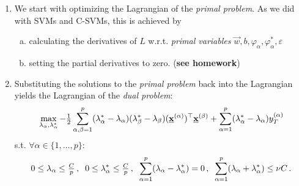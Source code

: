 \begin{frame}\frametitle{\subsecname}

\begin{enumerate}
\item We start with optimizing the Lagrangian of the \emph{primal problem}. As we did with SVMs and C-SVMs, this is achieved by
\begin{enumerate}[(a)]
\item calculating the derivatives of $L$ w.r.t. \emph{primal variables} $\vec w, b, \varphi_\alpha, \varphi_\alpha^*, \varepsilon$
\item setting the partial derivatives to zero. (\textbf{see homework})
\end{enumerate}

\item Substituting the solutions to the \emph{primal problem} back into the Lagrangian yields the Lagrangian of the \emph{dual problem}:
		\begin{equation}
		  \max_{\lambda_{\alpha}, \lambda_{\alpha}^*}
		  - {\textstyle \frac{1}{2}}\sum_{\alpha,\beta=1}^p(\lambda_{\alpha}^* -
		  \lambda_{\alpha}) (\lambda_{\beta}^* - \lambda_{\beta})
		  (\underline{\mathbf{x}}^{(\alpha)})^\top\underline{\mathbf{x}}^{(\beta)} +
		  \sum_{\alpha=1}^p(\lambda_{\alpha}^* 
		  - \lambda_{\alpha})y_T^{(\alpha)}
		  \nonumber
		\end{equation}
		s.t. $\forall \alpha \in \{1,\ldots,p\}$:
		$$
		  0 \leq \lambda_{\alpha} \leq {\textstyle \frac{C}{p}}
		  \,, \;\;
		  0 \leq \lambda_{\alpha}^* \leq {\textstyle \frac{C}{p}}
		  \,, \;\;
		  \sum_{\alpha=1}^p(\lambda_{\alpha} - \lambda_{\alpha}^*) = 0 
		  \,, \;\;
		  \sum_{\alpha=1}^p(\lambda_{\alpha} + \lambda_{\alpha}^*) 
		  \leq  \nu C \,.  \nonumber
		$$
\end{enumerate}


\end{frame}


